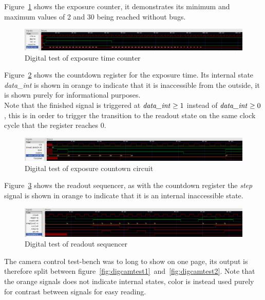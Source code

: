 Figure~\ref{fig:digexptest} shows the exposure counter, it demonstrates its minimum and maximum values of 2 and 30 being reached without bugs.

\begin{figure}[H]
  \centering
  \includegraphics[width=\textwidth]{figures/expTest}
  \caption{Digital test of exposure time counter}
  \label{fig:digexptest}
\end{figure}

Figure~\ref{fig:digfcdtest} shows the countdown register for the exposure time. Its internal state \textit{data\_int} is shown in orange
to indicate that it is inaccessible from the outside, it is shown purely for informational purposes.\\
Note that the finished signal is triggered at $\text{\textit{data\_int}} \geq 1$ instead of $\text{\textit{data\_int}} \geq 0$,
this is in order to trigger the transition to the readout state on the same clock cycle that the register reaches 0.

\begin{figure}[H]
  \centering
  \includegraphics[width=\textwidth]{figures/fcdTest}
  \caption{Digital test of exposure countown circuit}
  \label{fig:digfcdtest}
\end{figure}

Figure~\ref{fig:digreadouttest} shows the readout sequencer, as with the countdown register the \textit{step} signal is shown in orange to indicate
that it is an internal inaccessible state.

\begin{figure}[H]
  \centering
  \includegraphics[width=\textwidth]{figures/readoutTest}
  \caption{Digital test of readout sequencer}
  \label{fig:digreadouttest}
\end{figure}


The camera control test-bench was to long to show on one page, its output is therefore split between figure~\ref{fig:digcamtest1}~and~\ref{fig:digcamtest2}.
Note that the orange signals does not indicate internal states, color is instead used purely for contrast between signals for easy reading.

